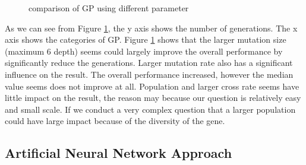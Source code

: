 \documentclass[11pt, a4paper, oneside, openright]{article}
\begin{document}
  \begin{figure}[!ht]
  \centerline{}
  \caption{comparison of GP using different parameter}
  \label{fig:comparison}
  \end{figure}

As we can see from Figure \ref{fig:comparison}, the y axis shows the number of generations. The x axis shows the categories of GP. Figure \ref{fig:comparison} shows that the larger mutation size (maximum 6 depth) seems could largely improve the overall performance by significantly reduce the generations. Larger mutation rate also has a significant influence on the result. The overall performance increased, however the median value seems does not improve at all. Population and larger cross rate seems have little impact on the result, the reason may because our question is relatively easy and small scale. If we conduct a very complex question that a larger population could have large impact because of the diversity of the gene.


\subsection{Artificial Neural Network Approach}
\end{document}
